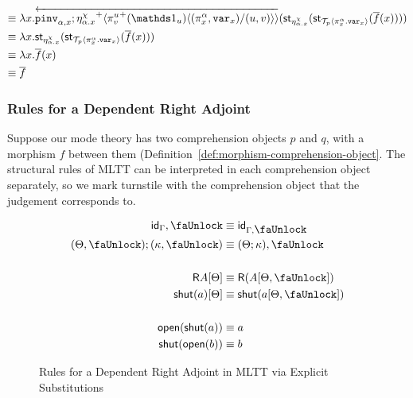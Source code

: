 \documentclass[10pt]{article}
\theoremstyle{definition}
\newcommand{\CTX}{\,\,\mathsf{Ctx}}
\newcommand{\TYPE}{\,\,\mathsf{Type}}
\newcommand{\id}{\mathsf{id}}
\newcommand{\rewrite}[2]{\overleftarrow{#1}(#2)}
\newcommand\UI[2]{\ensuremath{\lambda #1.#2}}
\newcommand\StI[2]{\ensuremath{\mathsf{st}_{#1}(#2)}}
\newcommand\TrPlus[2]{\ensuremath{{#1}^+(#2)}}
\newcommand\ApEl[2]{\mathcal{T}_{#1}\langle#2\rangle}
\newcommand\bdot[0]{\mathbin{.}}
\newcommand\ap[2]{\ensuremath{#1 \langle #2 \rangle }}
\newcommand\ApPlus[2]{\ensuremath{{#1}^+ \langle #2 \rangle }}
\begin{document}
\begin{enumerate}[style = multiline, labelwidth = 80pt]
\begin{align*}
\equiv{} &\UI{x}{\rewrite{\pinv{\alpha,x};\ApPlus{\eta^\chi_{\alpha.x}}{\ap{\TrPlus{\pi^u_v}{\One_u}}{(\pi^\alpha_x,\var{x})/(u,v)}}}{\StI{\eta^\chi_{\alpha.x}}{\StI{\ApEl{p}{\pi^\alpha_x \bdot \var{x}}}{\upstairs{f}(x)}}}} \\
\equiv{} &\UI{x}{\StI{\eta^\chi_{\alpha.x}}{\StI{\ApEl{p}{\pi^\alpha_x \bdot \var{x}}}{\upstairs{f}(x)}}} \\
\equiv{} &\UI{x}{\upstairs{f}(x)} \\
\equiv{} &\upstairs{f}
\end{align*}
\end{enumerate}

\subsubsection{Rules for a Dependent Right Adjoint}
\newcommand{\lock}{\mbox{\faUnlock}}
\newcommand{\Rtype}[1]{\mathsf{R}{#1}}
\newcommand{\RI}[1]{\mathsf{shut}({#1})}
\newcommand{\RE}[1]{\mathsf{open}({#1})}

Suppose our mode theory has two comprehension objects $p$ and $q$, with a morphism $f$ between them (Definition~\ref{def:morphism-comprehension-object}. The structural rules of MLTT can be interpreted in each comprehension object separately, so we mark turnstile with the comprehension object that the judgement corresponds to.

\begin{figure}
\begin{align}
\id_\Gamma , \lock &\equiv \id_{\Gamma, \lock} \\
(\Theta, \lock) ; (\kappa, \lock) &\equiv (\Theta ; \kappa), \lock \\
\nonumber \\
\Rtype{A}[\Theta] &\equiv \Rtype{(A[\Theta, \lock])} \\
\RI{a}[\Theta] &\equiv \RI{a[\Theta, \lock]} \\
\nonumber \\
\RE{\RI{a}} &\equiv a \\
\RI{\RE{b}} &\equiv b
\end{align}
\caption{Rules for a Dependent Right Adjoint in MLTT via Explicit Substitutions}\label{fig:qit-pi-rules}
\end{figure}
\end{document}
